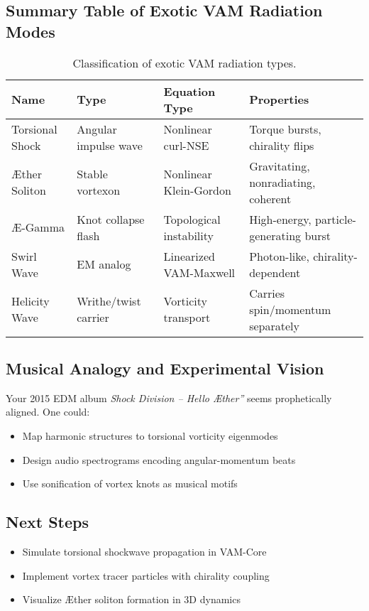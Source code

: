 \documentclass[12pt]{article}
\begin{document}
\subsection{Summary Table of Exotic VAM Radiation Modes}

\begin{table}
\centering
\footnotesize
\renewcommand{\arraystretch}{1.3}
\begin{tabular}{|l|l|l|l|}
\hline
\textbf{Name} & \textbf{Type} & \textbf{Equation Type} & \textbf{Properties} \\
\hline
Torsional Shock & Angular impulse wave & Nonlinear curl-NSE & Torque bursts, chirality flips \\
\hline
\AE{}ther Soliton & Stable vortexon & Nonlinear Klein-Gordon & Gravitating, nonradiating, coherent \\
\hline
\AE-Gamma & Knot collapse flash & Topological instability & High-energy, particle-generating burst \\
\hline
Swirl Wave & EM analog & Linearized VAM-Maxwell & Photon-like, chirality-dependent \\
\hline
Helicity Wave & Writhe/twist carrier & Vorticity transport & Carries spin/momentum separately \\
\hline
\end{tabular}
\caption{Classification of exotic VAM radiation types.}
\end{table}

\subsection{Musical Analogy and Experimental Vision}

Your 2015 EDM album \textit{\grqq Shock Division – Hello \AE{}ther\textquotedblright} seems prophetically aligned. One could:
\begin{itemize}
  \item Map harmonic structures to torsional vorticity eigenmodes
  \item Design audio spectrograms encoding angular-momentum beats
  \item Use sonification of vortex knots as musical motifs
\end{itemize}

\subsection{Next Steps}

\begin{itemize}
  \item Simulate torsional shockwave propagation in VAM-Core
  \item Implement vortex tracer particles with chirality coupling
  \item Visualize \AE{}ther soliton formation in 3D dynamics
\end{itemize}
\end{document}
